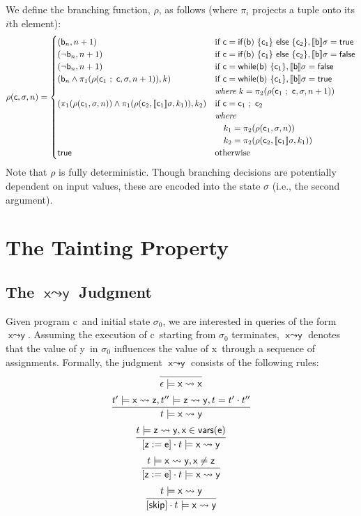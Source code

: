 \documentclass[]{article}
\newcommand{\lsyn}{[\![}
\newcommand{\rsyn}{]\!]}
\begin{document}
We define the branching function, $\rho$, as follows (where $\pi_i$ projects a tuple onto its $i$th element):
\[ 
\rho({\sf c},\sigma,n) = \begin{cases} 
({\sf b}_n,n+1) &
	\mbox{if } {\sf c}={\sf if (b)\ \{ c_1 \}\ else\ \{ c_2 \}},\lsyn {\sf b} \rsyn\sigma = {\sf true} \\ 
(\neg {\sf b}_n,n+1) &
	\mbox{if } {\sf c}={\sf if (b)\ \{ c_1 \}\ else\ \{ c_2 \}},\lsyn {\sf b} \rsyn\sigma = {\sf false} \\ 
(\neg {\sf b}_n,n+1) &
	\mbox{if } {\sf c}={\sf while (b)\ \{ c_1 \}},\lsyn {\sf b} \rsyn\sigma = {\sf false} \\ 
({\sf b}_n \wedge \pi_1(\rho({\sf c}_1\ ;\ {\sf c},\sigma,n+1)),k) &\mbox{if } {\sf c}={\sf while (b)\ \{ c_1 \}},\lsyn {\sf b} \rsyn\sigma = {\sf true} \\ 
& \textit{where}\ k = \pi_2(\rho({\sf c}_1\ ;\ {\sf c},\sigma,n+1)) \\
(\pi_1(\rho({\sf c}_1,\sigma,n)) \wedge  \pi_1(\rho({\sf c}_2,\lsyn {\sf c}_1 \rsyn \sigma,k_1)),k_2) &\mbox{if } {\sf c}={\sf c}_1\ ;\ {\sf c}_2 \\ 
& \textit{where} \\
& \quad k_1 = \pi_2(\rho({\sf c}_1,\sigma,n)) \\
& \quad k_2 = \pi_2(\rho({\sf c}_2,\lsyn {\sf c}_1 \rsyn \sigma,k_1)) \\
{\sf true} & \mbox{otherwise}
\end{cases}
\]
Note that $\rho$ is fully deterministic. Though branching decisions are potentially dependent on input values, these are encoded into the state $\sigma$ (i.e., the second argument).

\newcommand{\prog}{{\sf c}}
\newcommand{\progp}{{\sf c'}}
\newcommand{\xvar}{\textsf{x}}
\newcommand{\yvar}{\textsf{y}}
\newcommand{\zvar}{\textsf{z}}
\newcommand{\query}[2]{\textnormal{$#1 \leadsto #2$}}
\section{The Tainting Property}

\subsection{The \query{\xvar}{\yvar} Judgment}

Given program \prog\ and initial state $\sigma_0$, we are interested in queries of the form \query{\xvar}{\yvar}. Assuming the execution of \prog\ starting from $\sigma_0$ terminates, \query{\xvar}{\yvar} denotes that the value of \yvar\ in $\sigma_0$ influences the value of \xvar\ through a sequence of assignments. Formally, the judgment \query{\xvar}{\yvar} consists of the following rules:
\[
\infer{\epsilon \models \query{\xvar}{\xvar}}{}
\]
\[
\infer{t \models \query{\xvar}{\yvar}}{t' \models \query{\xvar}{\zvar},t'' \models \query{\zvar}{\yvar},t=t' \cdot t''}
\]
\[
\infer{[{\sf z := e}] \cdot t \models \query{\xvar}{\yvar}}{t \models \query{\zvar}{\yvar},\xvar \in {\sf vars}({\sf e})}
\]
\[
\infer{[{\sf z := e}] \cdot t \models \query{\xvar}{\yvar}}{t \models \query{\xvar}{\yvar},\xvar \neq \zvar}
\]
\[
\infer{[\nocommand] \cdot t \models \query{\xvar}{\yvar}}{t \models \query{\xvar}{\yvar}}
\]
\end{document}
